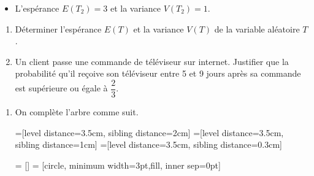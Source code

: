 \documentclass[11pt,fleqn, openany]{book} %
\begin{document}
\begin{exercise}[topic=lgn04, subtitle={(Métropole 2024, Jour 1)}]
\begin{enumerate}
\begin{itemize}
\item L'espérance $E (T_2) = 3$ et la variance $V (T_2) = 1$.
\end{itemize}
\vskip5pt
\begin{enumerate}
\item Déterminer l'espérance $E(T )$ et la variance $V (T )$ de la variable aléatoire $T$.
\item Un client passe une commande de téléviseur sur internet. Justifier que la probabilité qu'il reçoive son téléviseur entre 5 et 9 jours après sa commande est
supérieure ou égale à $\dfrac{2}{3}$.
\end{enumerate}
\end{enumerate}


\end{exercise}

\begin{solution}\hspace{0pt}
\begin{enumerate}
\item On complète l'arbre comme suit.

=[level distance=3.5cm, sibling distance=2cm]
=[level distance=3.5cm, sibling distance=1cm]
=[level distance=3.5cm, sibling distance=0.3cm]

 = []
 = [circle, minimum width=3pt,fill, inner sep=0pt]

\begin{center}
\end{center}


\end{enumerate}
\end{solution}
\end{document}
